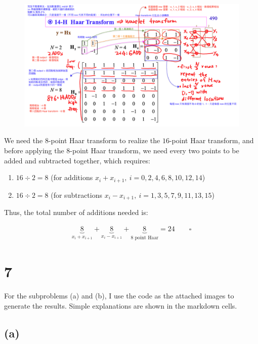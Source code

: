 \documentclass{article}
\begin{document}
\begin{figure}[H]
    \centering
    \includegraphics[width=\textwidth]{HW5_img/6_b.png}
\end{figure}

We need the $8$-point Haar transform to realize the $16$-point Haar transform, 
and before applying the $8$-point Haar transform, 
we need every two points to be added and subtracted together, 
which requires:

\begin{enumerate}
    \item $16 \div 2 = 8$ (for additions $x_i + x_{i+1}, \ i = 0, 2, 4, 6, 8, 10, 12, 14$)
    \item $16 \div 2 = 8$ (for subtractions $x_i - x_{i+1}, \ i = 1, 3, 5, 7, 9, 11, 13, 15$)
\end{enumerate}

Thus, the total number of additions needed is:

\begin{align*}
    \underbrace{8}_{x_i + x_{i+1}} + \underbrace{8}_{x_i - x_{i+1}} + \underbrace{8}_{\text{8 point Haar}} = 24 \qquad \square
\end{align*}

\section*{7}

For the subproblems (a) and (b), I use the code as the attached images to generate the results.
Simple explanations are shown in the markdown cells.

\subsection*{(a)}
\end{document}
